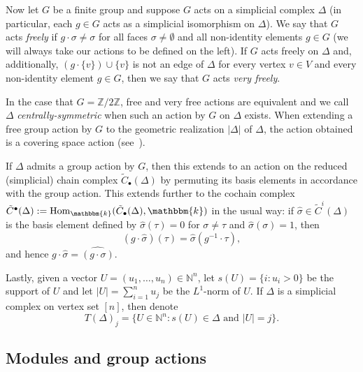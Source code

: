 \documentclass[10pt]{amsart}
\theoremstyle{definition}
\DeclareMathOperator{\Hom}{Hom}
\newcommand{\field}{\mathbbm{k}}
\newcommand{\NN}{{\mathbb N}}
\newcommand{\ZZ}{{\mathbb Z}}
\begin{document}
Now let $G$ be a finite group and suppose $G$ acts on a simplicial complex $\Delta$ (in particular, each $g\in G$ acts as a simplicial isomorphism on $\Delta$). We say that $G$ acts \emph{freely} if $g\cdot \sigma \not= \sigma$ for all faces $\sigma\not=\emptyset$ and all non-identity elements $g\in G$ (we will always take our actions to be defined on the left). If $G$ acts freely on $\Delta$ and, additionally, $(g\cdot\{v\})\cup\{v\}$ is not an edge of $\Delta$ for every vertex $v\in V$ and every non-identity element $g\in G$, then we say that $G$ acts \emph{very freely}.

In the case that $G=\ZZ/2\ZZ$, free and very free actions are equivalent and we call $\Delta$ \emph{centrally-symmetric} when such an action by $G$ on $\Delta$ exists. When extending a free group action by $G$ to the geometric realization $|\Delta|$ of $\Delta$, the action obtained is a covering space action (see~\cite[Section~1.3]{Hatcher}).

If $\Delta$ admits a group action by $G$, then this extends to an action on the reduced (simplicial) chain complex $\tilde{C}_\bullet(\Delta)$ by permuting its basis elements in accordance with the group action. This extends further to the cochain complex $\tilde{C}^\bullet(\Delta):=\Hom_\field(\tilde{C}_\bullet(\Delta), \field)$ in the usual way: if $\hat{\sigma}\in \tilde{C}^i(\Delta)$ is the basis element defined by $\hat{\sigma}(\tau)=0$ for $\sigma\not=\tau$ and $\hat{\sigma}(\sigma)=1$, then
\[
(g\cdot\hat{\sigma})(\tau)=\hat{\sigma}(g^{-1}\cdot\tau),
\]
and hence $g\cdot\hat{\sigma}=\widehat{(g\cdot\sigma)}$.

Lastly, given a vector $U=(u_1, \ldots, u_n)\in \NN^n$, let $s(U)=\{i:u_i>0\}$ be the support of $U$ and let $|U|=\sum_{i=1}^n u_j$ be the $L^1$-norm of $U$. If $\Delta$ is a simplicial complex on vertex set $[n]$, then denote
\[
T(\Delta)_j=\{U\in \NN^n:\text{$s(U)\in \Delta$ and $|U|=j$}\}.
\]

\subsection{Modules and group actions}\label{sect:mods}
\end{document}
